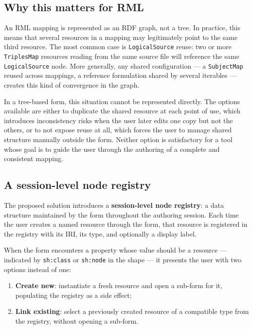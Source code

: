 \subsection{Why this matters for RML}

An RML mapping is represented as an RDF graph, not a tree.
In practice, this means that several resources in a mapping may legitimately point to the same third resource.
The most common case is \texttt{LogicalSource} reuse: two or more \texttt{TriplesMap} resources reading from the same source file will reference the same \texttt{LogicalSource} node.
More generally, any shared configuration --- a \texttt{SubjectMap} reused across mappings, a reference formulation shared by several iterables --- creates this kind of convergence in the graph.

In a tree-based form, this situation cannot be represented directly.
The options available are either to duplicate the shared resource at each point of use, which introduces inconsistency risks when the user later edits one copy but not the others, or to not expose reuse at all, which forces the user to
manage shared structure manually outside the form.
Neither option is satisfactory for a tool whose goal is to guide the user through the authoring of a complete and consistent mapping.

\subsection{A session-level node registry}

The proposed solution introduces a \textbf{session-level node registry}: a data structure maintained by the form throughout the authoring session.
Each time the user creates a named resource through the form, that resource is registered in the registry with its IRI, its type, and optionally a display label.

When the form encounters a property whose value should be a resource --- indicated by \texttt{sh:class} or \texttt{sh:node} in the shape --- it presents the user with two options instead of one:
\begin{enumerate}
  \item \textbf{Create new}: instantiate a fresh resource and open a sub-form for it, populating the registry as a side effect;
  \item \textbf{Link existing}: select a previously created resource of a compatible type from the registry, without opening a sub-form.
\end{enumerate}

